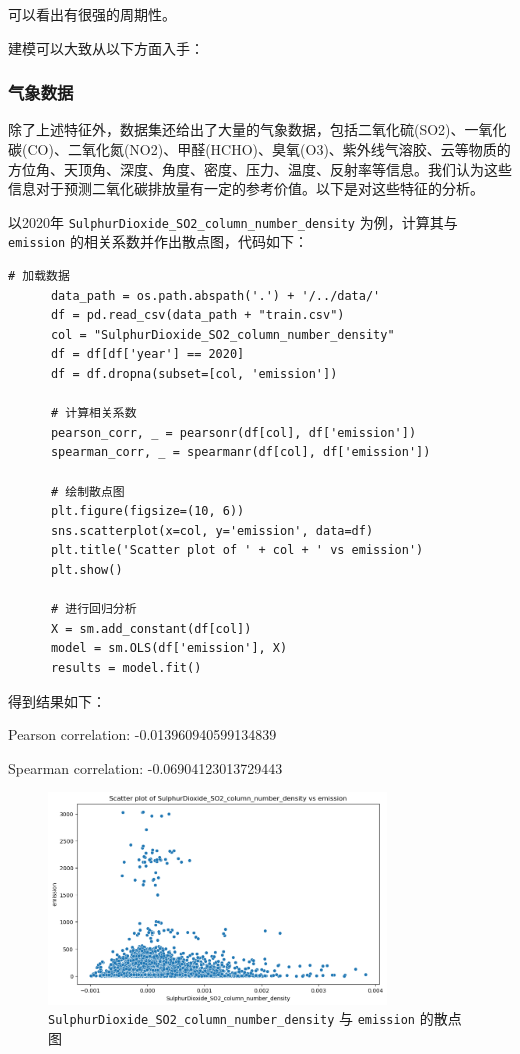 \documentclass{ctexart}
\begin{document}
可以看出有很强的周期性。

建模可以大致从以下方面入手：

\subsubsection{气象数据}

除了上述特征外，数据集还给出了大量的气象数据，包括二氧化硫(SO2)、一氧化碳(CO)、二氧化氮(NO2)、甲醛(HCHO)、臭氧(O3)、紫外线气溶胶、云等物质的方位角、天顶角、深度、角度、密度、压力、温度、反射率等信息。我们认为这些信息对于预测二氧化碳排放量有一定的参考价值。以下是对这些特征的分析。

以2020年 \texttt{SulphurDioxide\_SO2\_column\_number\_density} 为例，计算其与 \texttt{emission} 的相关系数并作出散点图，代码如下：

\begin{lstlisting}[style=Python]
      # 加载数据
      data_path = os.path.abspath('.') + '/../data/'
      df = pd.read_csv(data_path + "train.csv")
      col = "SulphurDioxide_SO2_column_number_density"
      df = df[df['year'] == 2020]
      df = df.dropna(subset=[col, 'emission'])
      
      # 计算相关系数
      pearson_corr, _ = pearsonr(df[col], df['emission'])
      spearman_corr, _ = spearmanr(df[col], df['emission'])
      
      # 绘制散点图
      plt.figure(figsize=(10, 6))
      sns.scatterplot(x=col, y='emission', data=df)
      plt.title('Scatter plot of ' + col + ' vs emission')
      plt.show()
      
      # 进行回归分析
      X = sm.add_constant(df[col])
      model = sm.OLS(df['emission'], X)
      results = model.fit()
\end{lstlisting}

得到结果如下：

\begin{center}
Pearson correlation: -0.013960940599134839

Spearman correlation: -0.06904123013729443
\end{center}


\begin{figure}[H]
      \centering
      \includegraphics[width=0.8\textwidth]{output1.png}
      \caption{\texttt{SulphurDioxide\_SO2\_column\_number\_density} 与 \texttt{emission} 的散点图}
\end{figure}
\end{document}
